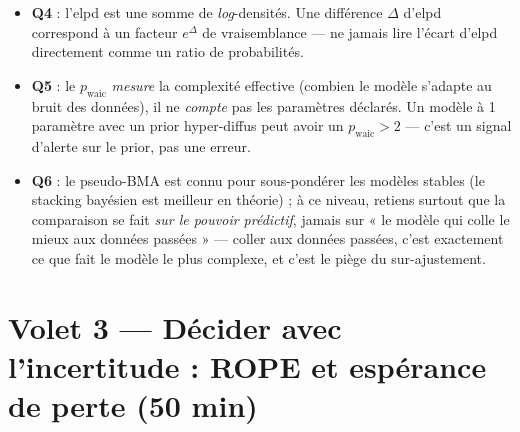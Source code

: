\documentclass[11pt,a4paper]{article}
\begin{document}
\begin{piege}[Questions 4 à 6]
\begin{itemize}[leftmargin=4mm, itemsep=0.5mm]
  \item \textbf{Q4} : l'elpd est une somme de \emph{log}-densités. Une
        différence $\Delta$ d'elpd correspond à un facteur $e^{\Delta}$ de
        vraisemblance --- ne jamais lire l'écart d'elpd directement comme un
        ratio de probabilités.
  \item \textbf{Q5} : le $p_{\text{waic}}$ \emph{mesure} la complexité
        effective (combien le modèle s'adapte au bruit des données), il ne
        \emph{compte} pas les paramètres déclarés. Un modèle à 1 paramètre
        avec un prior hyper-diffus peut avoir un $p_{\text{waic}} > 2$ --- c'est
        un signal d'alerte sur le prior, pas une erreur.
  \item \textbf{Q6} : le pseudo-BMA est connu pour sous-pondérer les modèles
        stables (le stacking bayésien est meilleur en théorie) ; à ce niveau,
        retiens surtout que la comparaison se fait \emph{sur le pouvoir
        prédictif}, jamais sur « le modèle qui colle le mieux aux données
        passées » --- coller aux données passées, c'est exactement ce que fait
        le modèle le plus complexe, et c'est le piège du sur-ajustement.
\end{itemize}
\end{piege}

\section{Volet 3 --- Décider avec l'incertitude : ROPE et espérance de perte (50 min)}
\end{document}
